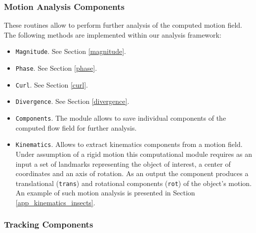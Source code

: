 \subsubsection {Motion Analysis Components}
\label{component_motion}

These routines allow to perform further analysis of the computed motion field. The following methods are implemented within our analysis framework:
\begin{itemize}
	\item \texttt{Magnitude}.  See Section \ref{magnitude}.
	
	\item \texttt{Phase}. See Section \ref{phase}.
	
	\item \texttt{Curl}. See Section \ref{curl}.
	
	\item \texttt{Divergence}. See Section \ref{divergence}.
	
	\item \texttt{Components}. The module allows to save individual components of the computed flow field for further analysis.
	
	\item \texttt{Kinematics}.  Allows to extract kinematics components from a motion field. Under assumption of a rigid motion this computational module requires as an input a set of landmarks representing the object of interest, a center of coordinates and an axis of rotation. As an output the component produces a translational (\texttt{trans}) and rotational components (\texttt{rot}) of the object's motion. An example of such motion analysis is presented in Section \ref{app_kinematics_insects}.  
\end{itemize}


\subsubsection {Tracking Components}

